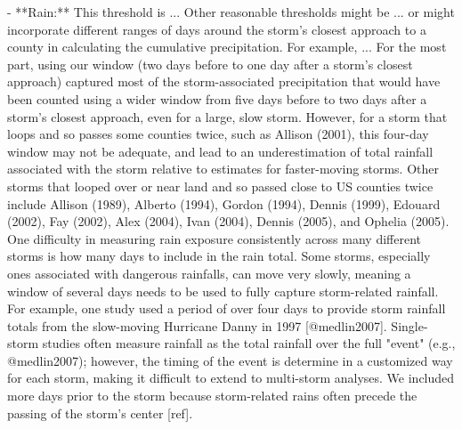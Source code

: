 - **Rain:** This threshold is ... Other reasonable thresholds might be ... or
might incorporate different ranges of days around the storm's closest approach
to a county in calculating the cumulative precipitation. For example, ... For
the most part, using our window (two days before to one day after a storm's
closest approach) captured most of the storm-associated precipitation that would
have been counted using a wider window from five days before to two days after a
storm's closest approach, even for a large, slow storm. However, for a storm
that loops and so passes some counties twice, such as Allison (2001), this
four-day window may not be adequate, and lead to an underestimation of total
rainfall associated with the storm relative to estimates for faster-moving
storms. Other storms that looped over or near land and so passed close to US
counties twice include Allison (1989), Alberto (1994), Gordon (1994), Dennis
(1999), Edouard (2002), Fay (2002), Alex (2004), Ivan (2004), Dennis (2005), and
Ophelia (2005). One difficulty in measuring rain exposure consistently across
many different storms is how many days to include in the rain total. Some
storms, especially ones associated with dangerous rainfalls, can move very
slowly, meaning a window of several days needs to be used to fully capture
storm-related rainfall. For example, one study used a period of over four days
to provide storm rainfall totals from the slow-moving Hurricane Danny in 1997
[@medlin2007]. Single-storm studies often measure rainfall as the total rainfall
over the full "event" (e.g., @medlin2007); however, the timing of the event is
determine in a customized way for each storm, making it difficult to extend to
multi-storm analyses. We included more days prior to the storm because
storm-related rains often precede the passing of the storm's center [ref]. 


